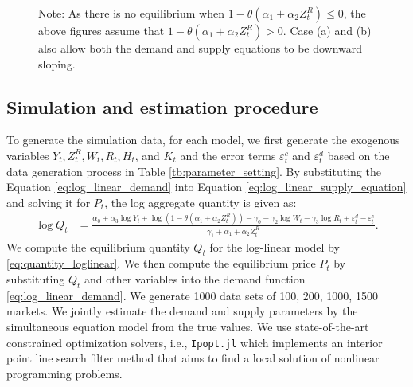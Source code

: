 \documentclass[11pt, a4paper]{article}
\theoremstyle{remark}
\begin{document}
\begin{figure}[!ht]
    \footnotesize
    Note: As there is no equilibrium when $1- \theta(\alpha_1 + \alpha_2 Z^{R}_{t}) \le 0$, the above figures assume that $1- \theta(\alpha_1 + \alpha_2 Z^{R}_{t}) > 0$. 
    Case (a) and (b) also allow both the demand and supply equations to be downward sloping.
\end{figure}







\newpage


\subsection{Simulation and estimation procedure}\label{sec:setting}
To generate the simulation data, for each model, we first generate the exogenous variables $Y_t, Z^{R}_{t}, W_t, R_{t}, H_t$, and $K_t$ and the error terms $\varepsilon_{t}^c$ and $\varepsilon_{t}^d$ based on the data generation process in Table \ref{tb:parameter_setting}.
By substituting the Equation \eqref{eq:log_linear_demand} into Equation \eqref{eq:log_linear_supply_equation} and solving it for $P_{t}$, the log aggregate quantity is given as: 
\begin{align}
    \log Q_t &= \frac{ \alpha_0 + \alpha_3 \log Y_t + \log (1 - \theta (\alpha_1 + \alpha_2 Z^{R}_{t})) - \gamma_0  -  \gamma_2 \log W_{t} - \gamma_3 \log R_t + \varepsilon^{d}_{t} - \varepsilon^{c}_{t}}{\gamma_1+ \alpha_1 + \alpha_2 Z^{R}_{t} }.\label{eq:quantity_loglinear}
\end{align}
We compute the equilibrium quantity $Q_{t}$ for the log-linear model by \eqref{eq:quantity_loglinear}.
We then compute the equilibrium price $P_t$ by substituting $Q_{t}$ and other variables into the demand function \eqref{eq:log_linear_demand}.
We generate 1000 data sets of 100, 200, 1000, 1500 markets.
We jointly estimate the demand and supply parameters by the simultaneous equation model \citep{wooldridge2010econometric} from the true values.
We use state-of-the-art constrained optimization solvers, i.e., \texttt{Ipopt.jl} which implements an interior point line search filter method that aims to find a local solution of nonlinear programming problems.
\end{document}
